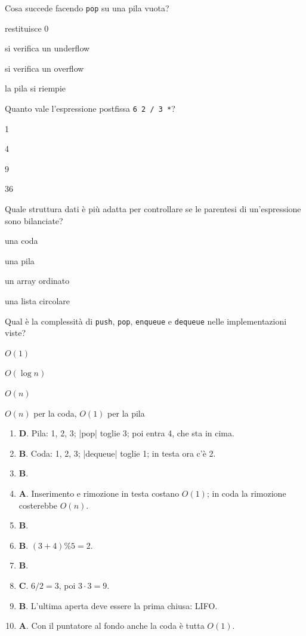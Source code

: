 \begin{quiz}{Cosa succede facendo \texttt{pop} su una pila vuota?}
  \item restituisce 0
  \item si verifica un underflow
  \item si verifica un overflow
  \item la pila si riempie
\end{quiz}

\begin{quiz}{Quanto vale l'espressione postfissa \texttt{6 2 / 3 *}?}
  \item 1
  \item 4
  \item 9
  \item 36
\end{quiz}

\begin{quiz}{Quale struttura dati è più adatta per controllare se le parentesi di un'espressione sono bilanciate?}
  \item una coda
  \item una pila
  \item un array ordinato
  \item una lista circolare
\end{quiz}

\begin{quiz}{Qual è la complessità di \texttt{push}, \texttt{pop}, \texttt{enqueue} e \texttt{dequeue} nelle implementazioni viste?}
  \item $O(1)$
  \item $O(\log n)$
  \item $O(n)$
  \item $O(n)$ per la coda, $O(1)$ per la pila
\end{quiz}

\begin{soluzione}
\begin{enumerate}[label=\textbf{\arabic*.}]
  \item \textbf{D}. Pila: 1, 2, 3; \cc|pop| toglie 3; poi entra 4, che sta in cima.
  \item \textbf{B}. Coda: 1, 2, 3; \cc|dequeue| toglie 1; in testa ora c'è 2.
  \item \textbf{B}.
  \item \textbf{A}. Inserimento e rimozione in testa costano $O(1)$; in coda la rimozione
        costerebbe $O(n)$.
  \item \textbf{B}.
  \item \textbf{B}. $(3 + 4) \% 5 = 2$.
  \item \textbf{B}.
  \item \textbf{C}. $6 / 2 = 3$, poi $3 \cdot 3 = 9$.
  \item \textbf{B}. L'ultima aperta deve essere la prima chiusa: LIFO.
  \item \textbf{A}. Con il puntatore al fondo anche la coda è tutta $O(1)$.
\end{enumerate}
\end{soluzione}

